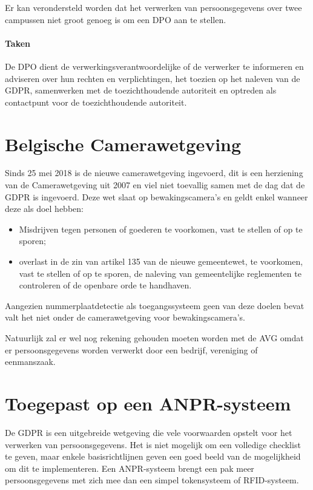 Er kan verondersteld worden dat het verwerken van persoonsgegevens over twee campussen niet groot genoeg is om een DPO aan te stellen.

\paragraph{Taken}
De DPO dient de verwerkingsverantwoordelijke of de verwerker te informeren en adviseren over hun rechten en verplichtingen, het toezien op het naleven van de GDPR, samenwerken met de toezichthoudende autoriteit en optreden als contactpunt voor de toezichthoudende autoriteit.


\section{Belgische Camerawetgeving}
Sinds 25 mei 2018 is de nieuwe camerawetgeving ingevoerd, dit is een herziening van de Camerawetgeving uit 2007 en viel niet toevallig samen met de dag dat de GDPR is ingevoerd. Deze wet slaat op bewakingscamera's en geldt enkel wanneer deze als doel hebben:
\begin{itemize}
	\item Misdrijven tegen personen of goederen te voorkomen, vast te stellen of op te sporen;
	\item overlast in de zin van artikel 135 van de nieuwe gemeentewet, te voorkomen, vast te stellen of op te sporen, de naleving van gemeentelijke reglementen te controleren of de openbare orde te handhaven.
\end{itemize}
Aangezien nummerplaatdetectie als toegangssysteem geen van deze doelen bevat valt het niet onder de camerawetgeving voor bewakingscamera's. \autocite{staatsblad2007wet}

Natuurlijk zal er wel nog rekening gehouden moeten worden met de AVG omdat er persoonsgegevens worden verwerkt door een bedrijf, vereniging of eenmanszaak. \autocite{gba2019videoparlofoon}

\section{Toegepast op een ANPR-systeem}
De GDPR is een uitgebreide wetgeving die vele voorwaarden opstelt voor het verwerken van persoonsgegevens. Het is niet mogelijk om een volledige checklist te geven, maar enkele basisrichtlijnen geven een goed beeld van de mogelijkheid om dit te implementeren. Een ANPR-systeem brengt een pak meer persoonsgegevens met zich mee dan een simpel tokensysteem of RFID-systeem.

